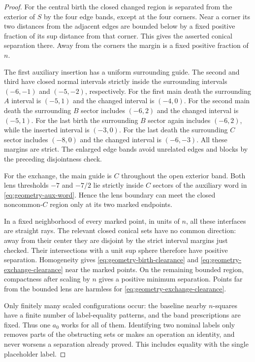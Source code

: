 \begin{proof}
For the central birth the closed changed region is separated from the
exterior of $S$ by the four edge bands, except at the four corners.
Near a corner its two distances from the adjacent edges are bounded
below by a fixed positive fraction of its sup distance from that
corner.  This gives the asserted conical separation there.  Away from
the corners the margin is a fixed positive fraction of $n$.

The first auxiliary insertion has a uniform surrounding guide.  The
second and third have closed normal intervals strictly inside the
surrounding intervals $(-6,-1)$ and $(-5,-2)$, respectively.  For the
first main death the surrounding $A$ interval is $(-5,1)$ and the
changed interval is $(-4,0)$.  For the second main death the surrounding
$B$ sector includes $(-6,2)$ and the changed interval is $(-5,1)$.
For the last birth the surrounding $B$ sector again includes
$(-6,2)$, while the inserted interval is $(-3,0)$.  For the last death
the surrounding $C$ sector includes $(-8,0)$ and the changed interval
is $(-6,-3)$.  All these margins are strict.  The enlarged edge bands
avoid unrelated edges and blocks by the preceding disjointness check.

For the exchange, the main guide is $C$ throughout the open exterior
band.  Both lens thresholds $-7$ and $-7/2$ lie strictly inside $C$
sectors of the auxiliary word in \eqref{eq:geometry-aux-word}.
Hence the lens boundary can meet the closed noncommon-$C$ region only
at its two marked endpoints.

In a fixed neighborhood of every marked point, in units of $n$, all
these interfaces are straight rays.  The relevant closed conical sets
have no common direction: away from their center they are disjoint by
the strict interval margins just checked.  Their intersections with a
unit sup sphere therefore have positive separation.  Homogeneity gives
\eqref{eq:geometry-birth-clearance} and
\eqref{eq:geometry-exchange-clearance} near the marked points.  On
the remaining bounded region, compactness after scaling by $n$ gives
a positive minimum separation.  Points far from the bounded lens are
harmless for \eqref{eq:geometry-exchange-clearance}.

Only finitely many scaled configurations occur: the baseline nearby
$n$-squares have a finite number of label-equality patterns, and the
band prescriptions are fixed.  Thus one $a_0$ works for all of them.
Identifying two nominal labels only removes parts of the obstructing
sets or makes an operation an identity, and never worsens a separation
already proved.  This includes equality with the single placeholder
label.
\end{proof}

